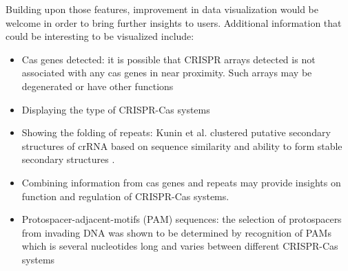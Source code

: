 \documentclass[11pt, a4paper,titlepage]{article}
\begin{document}
Building upon those features, improvement in data visualization would
be welcome in order to bring further insights to users. Additional
information that could be interesting to be visualized include:
\begin{itemize}
\item Cas genes detected: it is possible that CRISPR arrays detected
  is not associated with any cas genes in near proximity. Such arrays
  may be degenerated or have other functions
  \cite{mandin2007identification}
\item Displaying the type of CRISPR-Cas systems
\item Showing the folding of repeats: Kunin et al. clustered putative
  secondary structures of crRNA based on sequence similarity and
  ability to form stable secondary structures
  \cite{kunin2007evolutionary}.
\item Combining information from cas genes and repeats may provide
  insights on function and regulation of CRISPR-Cas systems.
\item Protospacer-adjacent-motifs (PAM) sequences: the selection of
  protospacers from invading DNA was shown to be determined by
  recognition of PAMs which is several nucleotides long and varies
  between different CRISPR-Cas systems
  \cite{mojica2009short,deveau2008phage}
\end{itemize}


\newpage
 

\end{document}
